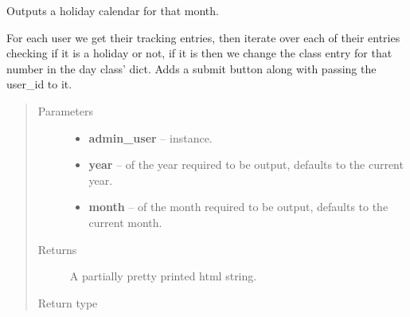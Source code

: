 \documentclass[letterpaper,10pt,english]{sphinxmanual}
\begin{document}
\begin{fulllineitems}
\label{code:timetracker.utils.calendar_utils.gen_holiday_list}
Outputs a holiday calendar for that month.

For each user we get their tracking entries, then iterate over each of
their entries checking if it is a holiday or not, if it is then we change
the class entry for that number in the day class' dict. Adds a submit
button along with passing the user\_id to it.
\begin{quote}\begin{description}
\item[{Parameters}] \leavevmode\begin{itemize}
\item {} 
\textbf{admin\_user} -- {\hyperref[code:timetracker.tracker.models.Tbluser]{}} instance.

\item {} 
\textbf{year} --  of the year required to be output, defaults to
the current year.

\item {} 
\textbf{month} --  of the month required to be output, defaults to
the current month.

\end{itemize}

\item[{Returns}] \leavevmode
A partially pretty printed html string.

\item[{Return type}] \leavevmode
{}

\end{description}\end{quote}

\end{fulllineitems}

\end{document}
